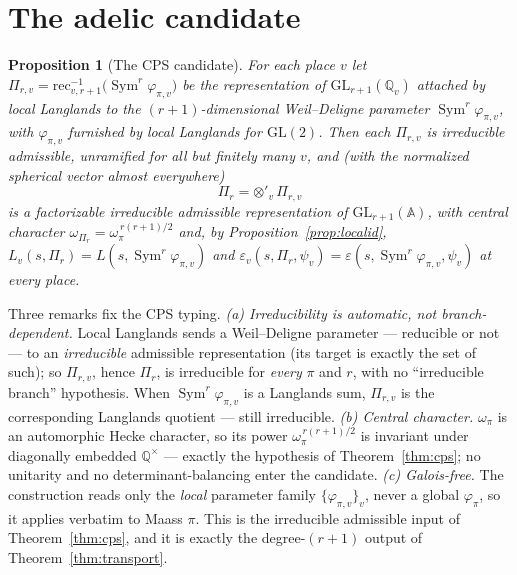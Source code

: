 \documentclass[11pt]{article}
\newtheorem{proposition}[theorem]{Proposition}
\theoremstyle{definition}
\newcommand{\Sym}{\operatorname{Sym}}
\begin{document}
\section{The adelic candidate}\label{sec:cps-cand}
\begin{proposition}[The CPS candidate]\label{prop:cps-cand}
For each place $v$ let $\Pi_{r,v}=\mathrm{rec}_{v,r+1}^{-1}\bigl(\Sym^r\varphi_{\pi,v}\bigr)$ be the
representation of $\mathrm{GL}_{r+1}(\mathbb Q_v)$ attached by local Langlands to the $(r+1)$-dimensional
Weil--Deligne parameter $\Sym^r\varphi_{\pi,v}$, with $\varphi_{\pi,v}$ furnished by local Langlands for
$\mathrm{GL}(2)$. Then each $\Pi_{r,v}$ is \emph{irreducible admissible}, unramified for all but finitely many
$v$, and (with the normalized spherical vector almost everywhere)
\[
  \Pi_r=\otimes'_v\,\Pi_{r,v}
\]
is a factorizable \emph{irreducible admissible} representation of $\mathrm{GL}_{r+1}(\mathbb A)$, with central
character $\omega_{\Pi_r}=\omega_\pi^{\,r(r+1)/2}$ and, by Proposition~\ref{prop:localid},
$L_v(s,\Pi_r)=L(s,\Sym^r\varphi_{\pi,v})$ and
$\varepsilon_v(s,\Pi_r,\psi_v)=\varepsilon(s,\Sym^r\varphi_{\pi,v},\psi_v)$ at every place.
\end{proposition}
\noindent Three remarks fix the CPS typing. \emph{(a) Irreducibility is automatic, not branch-dependent.}
Local Langlands sends a Weil--Deligne parameter --- reducible or not --- to an \emph{irreducible} admissible
representation (its target is exactly the set of such); so $\Pi_{r,v}$, hence $\Pi_r$, is irreducible for
\emph{every} $\pi$ and $r$, with no ``irreducible branch'' hypothesis. When $\Sym^r\varphi_{\pi,v}$ is a
Langlands sum, $\Pi_{r,v}$ is the corresponding Langlands quotient --- still irreducible. \emph{(b) Central
character.} $\omega_\pi$ is an automorphic Hecke character, so its power $\omega_\pi^{\,r(r+1)/2}$ is invariant
under diagonally embedded $\mathbb Q^\times$ --- exactly the hypothesis of Theorem~\ref{thm:cps}; no unitarity
and no determinant-balancing enter the candidate. \emph{(c) Galois-free.} The construction reads only the
\emph{local} parameter family $\{\varphi_{\pi,v}\}_v$, never a global $\varphi_\pi$, so it applies verbatim to
Maass $\pi$. This is the irreducible admissible input of Theorem~\ref{thm:cps}, and it is exactly the
degree-$(r+1)$ output of Theorem~\ref{thm:transport}.
\end{document}
